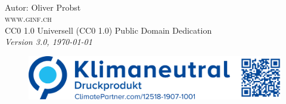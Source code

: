 
\newpage
~\vfill
\thispagestyle{empty}

\noindent Autor: Oliver Probst\\

\noindent \textsc{www.ginf.ch}\\

\noindent \ccLogo \hspace{0.1cm} \ccZero \hspace{0.1cm} CC0 1.0 Universell (CC0 1.0) Public Domain Dedication \\

\noindent \textit{Version 3.0, \today}

\begin{figure}[htb]
\includegraphics[scale=0.15]{climate}
\end{figure}
